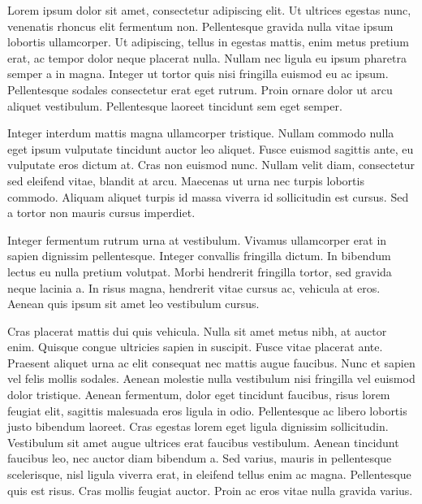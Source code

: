 


\begin{acknowledgements}      

Lorem ipsum dolor sit amet, consectetur adipiscing elit. Ut ultrices egestas nunc, venenatis rhoncus elit fermentum non. Pellentesque gravida nulla vitae ipsum lobortis ullamcorper. Ut adipiscing, tellus in egestas mattis, enim metus pretium erat, ac tempor dolor neque placerat nulla. Nullam nec ligula eu ipsum pharetra semper a in magna. Integer ut tortor quis nisi fringilla euismod eu ac ipsum. Pellentesque sodales consectetur erat eget rutrum. Proin ornare dolor ut arcu aliquet vestibulum. Pellentesque laoreet tincidunt sem eget semper.

Integer interdum mattis magna ullamcorper tristique. Nullam commodo nulla eget ipsum vulputate tincidunt auctor leo aliquet. Fusce euismod sagittis ante, eu vulputate eros dictum at. Cras non euismod nunc. Nullam velit diam, consectetur sed eleifend vitae, blandit at arcu. Maecenas ut urna nec turpis lobortis commodo. Aliquam aliquet turpis id massa viverra id sollicitudin est cursus. Sed a tortor non mauris cursus imperdiet.

Integer fermentum rutrum urna at vestibulum. Vivamus ullamcorper erat in sapien dignissim pellentesque. Integer convallis fringilla dictum. In bibendum lectus eu nulla pretium volutpat. Morbi hendrerit fringilla tortor, sed gravida neque lacinia a. In risus magna, hendrerit vitae cursus ac, vehicula at eros. Aenean quis ipsum sit amet leo vestibulum cursus.

Cras placerat mattis dui quis vehicula. Nulla sit amet metus nibh, at auctor enim. Quisque congue ultricies sapien in suscipit. Fusce vitae placerat ante. Praesent aliquet urna ac elit consequat nec mattis augue faucibus. Nunc et sapien vel felis mollis sodales. Aenean molestie nulla vestibulum nisi fringilla vel euismod dolor tristique. Aenean fermentum, dolor eget tincidunt faucibus, risus lorem feugiat elit, sagittis malesuada eros ligula in odio. Pellentesque ac libero lobortis justo bibendum laoreet. Cras egestas lorem eget ligula dignissim sollicitudin. Vestibulum sit amet augue ultrices erat faucibus vestibulum. Aenean tincidunt faucibus leo, nec auctor diam bibendum a. Sed varius, mauris in pellentesque scelerisque, nisl ligula viverra erat, in eleifend tellus enim ac magna. Pellentesque quis est risus. Cras mollis feugiat auctor. Proin ac eros vitae nulla gravida varius.


\end{acknowledgements}
